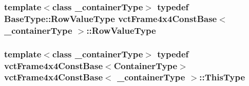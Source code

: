 \subsubsection[{Row\+Value\+Type}]{\setlength{\rightskip}{0pt plus 5cm}template$<$class \+\_\+container\+Type$>$ typedef Base\+Type\+::\+Row\+Value\+Type {\bf vct\+Frame4x4\+Const\+Base}$<$ \+\_\+container\+Type $>$\+::{\bf Row\+Value\+Type}}\label{classvct_frame4x4_const_base_aa63c7449b3c8248ec0d2e852d2389ae9}
\hypertarget{classvct_frame4x4_const_base_acb37107e49c20bd15139ff196aff1087}{}
\subsubsection[{This\+Type}]{\setlength{\rightskip}{0pt plus 5cm}template$<$class \+\_\+container\+Type$>$ typedef {\bf vct\+Frame4x4\+Const\+Base}$<${\bf Container\+Type}$>$ {\bf vct\+Frame4x4\+Const\+Base}$<$ \+\_\+container\+Type $>$\+::{\bf This\+Type}}\label{classvct_frame4x4_const_base_acb37107e49c20bd15139ff196aff1087}
\hypertarget{classvct_frame4x4_const_base_aabe7499444284102317fe1af3a3f6978}{}
